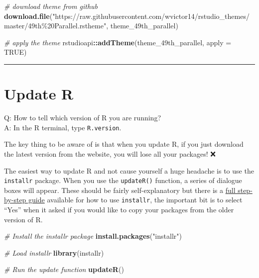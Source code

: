 \documentclass[
]{book}
\newenvironment{Shaded}{\begin{snugshade}}{\end{snugshade}}
\newcommand{\AttributeTok}[1]{\textcolor[rgb]{0.13,0.29,0.53}{#1}}
\newcommand{\CommentTok}[1]{\textcolor[rgb]{0.56,0.35,0.01}{\textit{#1}}}
\newcommand{\ConstantTok}[1]{\textcolor[rgb]{0.56,0.35,0.01}{#1}}
\newcommand{\FunctionTok}[1]{\textcolor[rgb]{0.13,0.29,0.53}{\textbf{#1}}}
\newcommand{\NormalTok}[1]{#1}
\newcommand{\SpecialCharTok}[1]{\textcolor[rgb]{0.81,0.36,0.00}{\textbf{#1}}}
\newcommand{\StringTok}[1]{\textcolor[rgb]{0.31,0.60,0.02}{#1}}
\theoremstyle{definition}
\theoremstyle{definition}
\theoremstyle{definition}
\theoremstyle{definition}
\theoremstyle{remark}
\begin{document}
\begin{itemize}
\begin{Shaded}
\begin{Highlighting}[]
\CommentTok{\# download theme from github}
\FunctionTok{download.file}\NormalTok{(}\StringTok{"https://raw.githubusercontent.com/wvictor14/rstudio\_themes/master/49th\%20Parallel.rstheme"}\NormalTok{, }
\NormalTok{              theme\_49th\_parallel)}

\CommentTok{\# apply the theme}
\NormalTok{rstudioapi}\SpecialCharTok{::}\FunctionTok{addTheme}\NormalTok{(theme\_49th\_parallel, }
                     \AttributeTok{apply =} \ConstantTok{TRUE}\NormalTok{)}
\end{Highlighting}
\end{Shaded}
\end{itemize}

\begin{center}\rule{0.5\linewidth}{0.5pt}\end{center}

\section{Update R}\label{update-r}

Q: How to tell which version of R you are running?\\
A: In the R terminal, type \texttt{R.version}.

The key thing to be aware of is that when you update R, {if you just download the latest version from the website, you will lose all your packages!} ❌

The easiest way to update R and not cause yourself a huge headache is to use the \texttt{installr} package. When you use the \texttt{updateR()} function, a series of dialogue boxes will appear. These should be fairly self-explanatory but there is a \href{https://www.r-statistics.com/2015/06/a-step-by-step-screenshots-tutorial-for-upgrading-r-on-windows/\#google_vignette}{full step-by-step guide} available for how to use \texttt{installr}, the important bit is to {select ``Yes'' when it asked if you would like to copy your packages from the older version of R}.

\begin{Shaded}
\begin{Highlighting}[]
\CommentTok{\# Install the installr package}
\FunctionTok{install.packages}\NormalTok{(}\StringTok{"installr"}\NormalTok{)}

\CommentTok{\# Load installr}
\FunctionTok{library}\NormalTok{(installr)}

\CommentTok{\# Run the update function}
\FunctionTok{updateR}\NormalTok{()}
\end{Highlighting}
\end{Shaded}
\end{document}
